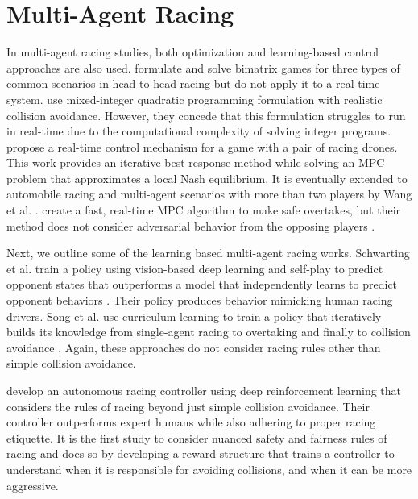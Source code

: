 \section{Multi-Agent Racing}
In multi-agent racing studies, both optimization and learning-based control approaches are also used. \citet{Liniger2020} formulate and solve bimatrix games for three types of common scenarios in head-to-head racing but do not apply it to a real-time system. \citet{Li2021} use mixed-integer quadratic programming formulation with realistic collision avoidance. However, they concede that this formulation struggles to run in real-time due to the computational complexity of solving integer programs. \citet{spica2020real} propose a real-time control mechanism for a game with a pair of racing drones. This work provides an iterative-best response method while solving an MPC problem that approximates a local Nash equilibrium. It is eventually extended to automobile racing and multi-agent scenarios with more than two players by Wang et al. \cite{Wang2019, Wang2021}. \citet{He2021} create a fast, real-time MPC algorithm to make safe overtakes, but their method does not consider adversarial behavior from the opposing players . 

Next, we outline some of the learning based multi-agent racing works. Schwarting et al. train a policy using vision-based deep learning and self-play to predict opponent states that outperforms a model that independently learns to predict opponent behaviors \cite{Schwarting2021}. Their policy produces behavior mimicking human racing drivers. Song et al. use curriculum learning to train a policy that iteratively builds its knowledge from single-agent racing to overtaking and finally to collision avoidance \cite{Song2021}. Again, these approaches do not consider racing rules other than simple collision avoidance. 

\citet{sonyai} develop an autonomous racing controller using deep reinforcement learning that considers the rules of racing beyond just simple collision avoidance. Their controller outperforms expert humans while also adhering to proper racing etiquette. It is the first study to consider nuanced safety and fairness rules of racing and does so by developing a reward structure that trains a controller to understand when it is responsible for avoiding collisions, and when it can be more aggressive.  

